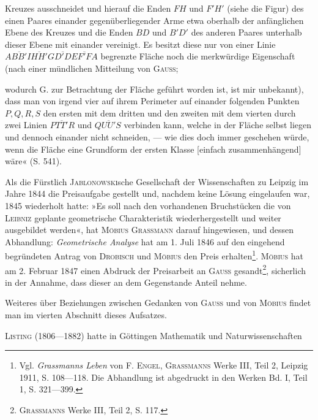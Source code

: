 \begin{minipage}[t]{.65\linewidth}
\vspace{0pt}\setlength{\parindent}{1.2em}\noindent
Kreuzes ausschneidet und hierauf die Enden \(FH\)
und \(F'H'\) (siehe die Figur) des einen Paares einander
gegenüberliegender Arme etwa oberhalb der
anfänglichen Ebene des Kreuzes und die Enden
\(BD\) und \(B'D'\) des anderen Paares unterhalb dieser
Ebene mit einander vereinigt. Es besitzt diese
nur von einer Linie \(A\overline{BB'}I\overline{HH'}G\overline{D'D}E\overline{F'F}A\)
begrenzte Fläche noch die merkwürdige Eigenschaft
(nach einer mündlichen Mitteilung von \textsc{Gauss};
\end{minipage}
\clearpage{}\setcounter{footnote}{0}
\noindent wodurch G. zur Betrachtung der Fläche geführt worden ist, ist mir unbekannt),
dass man von irgend vier auf ihrem Perimeter auf einander folgenden
Punkten \(P, Q, R, S\) den ersten mit dem dritten und den zweiten mit dem
vierten durch zwei Linien \(P\overline{TT'}R\) und \(Q\overline{UU'}S\) verbinden kann, welche in
der Fläche selbst liegen und dennoch einander nicht schneiden, — wie dies
doch immer geschehen würde, wenn die Fläche eine Grundform der ersten
Klasse [einfach zusammenhängend] wäre« (S. 541).
\par
Als die Fürstlich \textsc{Jablonowski}sche Gesellschaft der Wissenschaften zu
Leipzig im Jahre 1844 die Preisaufgabe gestellt und, nachdem keine Lösung
eingelaufen war, 1845 wiederholt hatte: »Es soll nach den vorhandenen Bruchstücken
die von \textsc{Leibniz} geplante geometrische Charakteristik wiederhergestellt
und weiter ausgebildet werden«, hat \textsc{Möbius Grassmann} darauf hingewiesen,
und dessen Abhandlung: \textit{Geometrische Analyse} hat am 1. Juli 1846 auf den
eingehend begründeten Antrag von \textsc{Drobisch} und \textsc{Möbius} den Preis erhalten\footnote{Vgl. \textit{Grassmanns Leben} von F. \textsc{Engel}, \textsc{Grassmanns} Werke III, Teil 2, Leipzig 1911, S. 108—118. Die Abhandlung ist abgedruckt in den Werken Bd. I, Teil 1, S. 321—399.}.
\textsc{Möbius} hat am 2. Februar 1847 einen Abdruck der Preisarbeit an \textsc{Gauss} gesandt\footnote{\textsc{Grassmanns} Werke III, Teil 2, S. 117.},
sicherlich in der Annahme, dass dieser an dem Gegenstande Anteil
nehme.
\par
Weiteres über Beziehungen zwischen Gedanken von \textsc{Gauss} und von \textsc{Möbius}
findet man im vierten Abschnitt dieses Aufsatzes.
\par\medskip
\textsc{Listing} (1806—1882) hatte in Göttingen Mathematik und Naturwissenschaften
